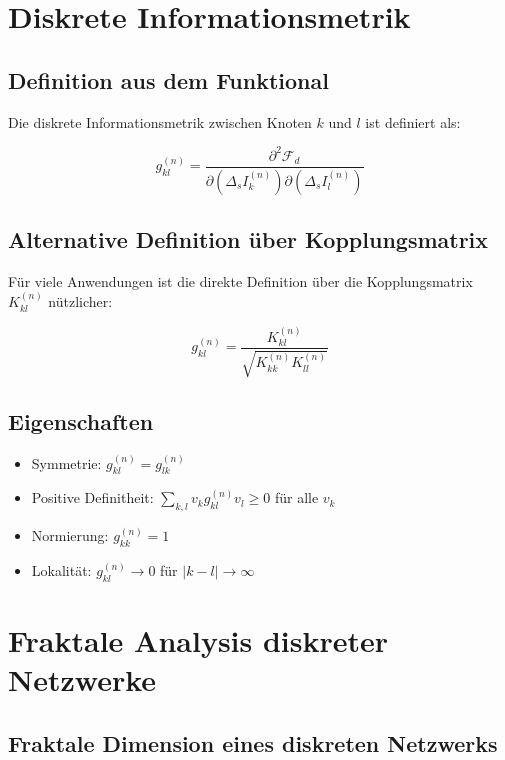 \section{Diskrete Informationsmetrik}
\label{app:mathematik_metrik}

\subsection{Definition aus dem Funktional}
\label{sub:mathematik_metrik_def}

Die diskrete Informationsmetrik zwischen Knoten \( k \) und \( l \) ist definiert als:

\[
g_{kl}^{(n)} = \frac{\partial^2 \mathcal{F}_d}{\partial (\Delta_s I_k^{(n)}) \partial (\Delta_s I_l^{(n)})}
\]

\subsection{Alternative Definition über Kopplungsmatrix}
\label{sub:mathematik_metrik_kopplung}

Für viele Anwendungen ist die direkte Definition über die Kopplungsmatrix \( K_{kl}^{(n)} \) nützlicher:

\[
g_{kl}^{(n)} = \frac{K_{kl}^{(n)}}{\sqrt{K_{kk}^{(n)} K_{ll}^{(n)}}}
\]

\subsection{Eigenschaften}
\label{sub:mathematik_metrik_eigenschaften}

\begin{itemize}
    \item Symmetrie: \( g_{kl}^{(n)} = g_{lk}^{(n)} \)
    \item Positive Definitheit: \( \sum_{k,l} v_k g_{kl}^{(n)} v_l \geq 0 \) für alle \( v_k \)
    \item Normierung: \( g_{kk}^{(n)} = 1 \)
    \item Lokalität: \( g_{kl}^{(n)} \to 0 \) für \( |k-l| \to \infty \)
\end{itemize}

\section{Fraktale Analysis diskreter Netzwerke}
\label{app:mathematik_fraktal}

\subsection{Fraktale Dimension eines diskreten Netzwerks}
\label{sub:mathematik_fraktale_dim}

